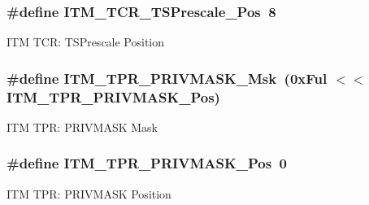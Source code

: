 \subsubsection[{\texorpdfstring{I\+T\+M\+\_\+\+T\+C\+R\+\_\+\+T\+S\+Prescale\+\_\+\+Pos}{ITM_TCR_TSPrescale_Pos}}]{\setlength{\rightskip}{0pt plus 5cm}\#define I\+T\+M\+\_\+\+T\+C\+R\+\_\+\+T\+S\+Prescale\+\_\+\+Pos~8}\hypertarget{group__CMSIS__CM3__ITM_gad7bc9ee1732032c6e0de035f0978e473}{}\label{group__CMSIS__CM3__ITM_gad7bc9ee1732032c6e0de035f0978e473}
I\+TM T\+CR\+: T\+S\+Prescale Position 
\subsubsection[{\texorpdfstring{I\+T\+M\+\_\+\+T\+P\+R\+\_\+\+P\+R\+I\+V\+M\+A\+S\+K\+\_\+\+Msk}{ITM_TPR_PRIVMASK_Msk}}]{\setlength{\rightskip}{0pt plus 5cm}\#define I\+T\+M\+\_\+\+T\+P\+R\+\_\+\+P\+R\+I\+V\+M\+A\+S\+K\+\_\+\+Msk~(0x\+Ful $<$$<$ I\+T\+M\+\_\+\+T\+P\+R\+\_\+\+P\+R\+I\+V\+M\+A\+S\+K\+\_\+\+Pos)}\hypertarget{group__CMSIS__CM3__ITM_ga168e089d882df325a387aab3a802a46b}{}\label{group__CMSIS__CM3__ITM_ga168e089d882df325a387aab3a802a46b}
I\+TM T\+PR\+: P\+R\+I\+V\+M\+A\+SK Mask 
\subsubsection[{\texorpdfstring{I\+T\+M\+\_\+\+T\+P\+R\+\_\+\+P\+R\+I\+V\+M\+A\+S\+K\+\_\+\+Pos}{ITM_TPR_PRIVMASK_Pos}}]{\setlength{\rightskip}{0pt plus 5cm}\#define I\+T\+M\+\_\+\+T\+P\+R\+\_\+\+P\+R\+I\+V\+M\+A\+S\+K\+\_\+\+Pos~0}\hypertarget{group__CMSIS__CM3__ITM_ga7abe5e590d1611599df87a1884a352e8}{}\label{group__CMSIS__CM3__ITM_ga7abe5e590d1611599df87a1884a352e8}
I\+TM T\+PR\+: P\+R\+I\+V\+M\+A\+SK Position 